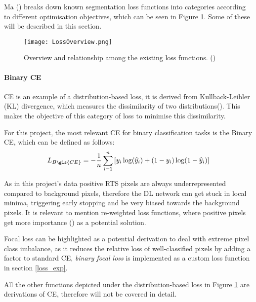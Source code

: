 Ma (\cite{LossOdyssey}) breaks down known segmentation loss functions into categories according to different optimisation objectives, which can be seen in Figure \ref{fig_loss_odissey}. Some of these will be described in this section.

    \begin{figure}[hbt!]
        \centering
        \texttt{[image: LossOverview.png]}
        \caption{Overview and relationship among the existing loss functions. (\cite{LossOdyssey})}
        \label{fig_loss_odissey}
    \end{figure}


\paragraph{Binary \gls{CE}}
\paragraph{}
\gls{CE} is an example of a distribution-based loss, it is derived from Kullback-Leibler (KL) divergence, which measures the dissimilarity of two distributions(\cite{LossOdyssey}). This makes the objective of this category of loss to minimise this dissimilarity. 

For this project, the most relevant \gls{CE} for binary classification tasks is the Binary \gls{CE}, which can be defined as follows:
\begin{equation} \label{eq:bintropy}
L_{B\gls{CE}} = -\frac{1}{n}\sum_{i=1}^n{[y_{i} \log(\widehat{y}_{i})+(1-y_{i})\log(1-\widehat{y}_{i})]}
\end{equation}

As in this project's data positive \gls{RTS} pixels are always underrepresented compared to background pixels, therefore the \gls{DL} network can get stuck in local minima, triggering early stopping and be very biased towards the background pixels. 
 It is relevant to mention re-weighted loss functions, where positive pixels get more importance (\cite{ronneberger2015unet}) as a potential solution.
 
Focal loss can be highlighted as a potential derivation to deal with extreme pixel class imbalance, as it reduces the relative loss of well-classified pixels by adding a factor to standard \gls{CE}, \textit{binary focal loss} is implemented as a custom loss function in section \ref{loss_exp}.
 
All the other functions depicted under the distribution-based loss in Figure \ref{fig_loss_odissey} are derivations of \gls{CE}, therefore will not be covered in detail. 
